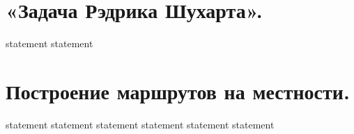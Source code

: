 \section{«Задача Рэдрика Шухарта».}

{statement}
{statement}

\section{Построение маршрутов на местности.}

{statement}
{statement}
{statement}
{statement}
{statement}
{statement}